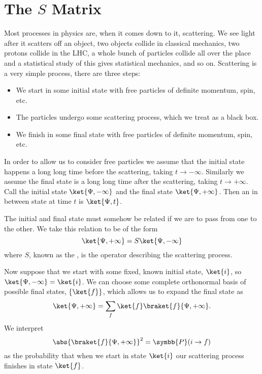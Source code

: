 \documentclass[fleqn]{NotesClass}
\newcommand{\probability}{\symbb{P}}
\begin{document}
    \section{The \texorpdfstring{\(S\)}{S} Matrix}
    Most processes in physics are, when it comes down to it, scattering.
    We see light after it scatters off an object, two objects collide in classical mechanics, two protons collide in the LHC, a whole bunch of particles collide all over the place and a statistical study of this gives statistical mechanics, and so on.
    Scattering is a very simple process, there are three steps:
    \begin{itemize}
        \item We start in some initial state with free particles of definite momentum, spin, etc.
        \item The particles undergo some scattering process, which we treat as a black box.
        \item We finish in some final state with free particles of definite momentum, spin, etc.
    \end{itemize}
    
    In order to allow us to consider free particles we assume that the initial state happens a long long time before the scattering, taking \(t \to -\infty\).
    Similarly we assume the final state is a long long time after the scattering, taking \(t \to +\infty\).
    Call the initial state \(\ket{\Psi, -\infty}\) and the final state \(\ket{\Psi, +\infty}\).
    Then an in between state at time \(t\) is \(\ket{\Psi, t}\).
    
    The initial and final state must somehow be related if we are to pass from one to the other.
    We take this relation to be of the form
    \begin{equation}
        \ket{\Psi, +\infty} = S\ket{\Psi, -\infty}
    \end{equation}
    where \(S\), known as the , is the operator describing the scattering process.
    
    Now suppose that we start with some fixed, known initial state, \(\ket{i}\), so \(\ket{\Psi, -\infty} = \ket{i}\).
    We can choose some complete orthonormal basis of possible final states, \(\{\ket{f}\}\), which allows us to expand the final state as
    \begin{equation}
        \ket{\Psi, +\infty} = \sum_f \ket{f}\braket{f}{\Psi, +\infty}.
    \end{equation}
    We interpret
    \begin{equation}
        \abs{\braket{f}{\Psi, +\infty}}^2 = \probability(i \to f)
    \end{equation}
    as the probability that when we start in state \(\ket{i}\) our scattering process finishes in state \(\ket{f}\).
    
\end{document}

